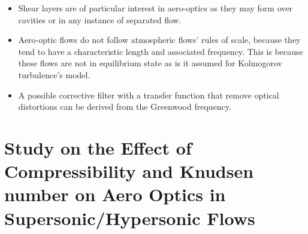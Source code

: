 \begin{itemize}
            \item Shear layers are of particular interest in aero-optics as they may form over cavities or in any instance of separated flow. 
            \item Aero-optic flows do not follow atmospheric flows' rules of scale, because they tend to have a characteristic length and associated frequency. This is because these flows are not in equilibrium state as is it assumed for Kolmogorov turbulence's model. 
            \item A possible corrective filter with a transfer function that remove optical distortions can be derived from the Greenwood frequency. 
        \end{itemize}

    \section{Study on the Effect of Compressibility and Knudsen number on Aero Optics in Supersonic/Hypersonic Flows \cite{ren:fdc:2012}} 
